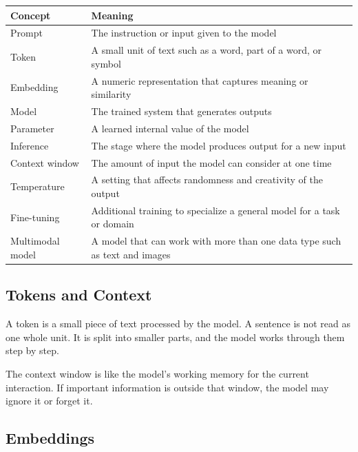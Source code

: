 \documentclass[11pt,a4paper]{article}
\begin{document}
\begin{longtable}{@{}p{3.6cm}p{9.9cm}@{}}
\toprule
\rowcolor{primary!15}
\textbf{Concept} & \textbf{Meaning} \\
\midrule
\endhead
Prompt & The instruction or input given to the model \\
\addlinespace
Token & A small unit of text such as a word, part of a word, or symbol \\
\addlinespace
Embedding & A numeric representation that captures meaning or similarity \\
\addlinespace
Model & The trained system that generates outputs \\
\addlinespace
Parameter & A learned internal value of the model \\
\addlinespace
Inference & The stage where the model produces output for a new input \\
\addlinespace
Context window & The amount of input the model can consider at one time \\
\addlinespace
Temperature & A setting that affects randomness and creativity of the output \\
\addlinespace
Fine-tuning & Additional training to specialize a general model for a task or domain \\
\addlinespace
Multimodal model & A model that can work with more than one data type such as text and images \\
\bottomrule
\end{longtable}

\subsection{Tokens and Context}

\begin{definitionbox}[Token]
A token is a small piece of text processed by the model. A sentence is not read as one whole unit. It is split into smaller parts, and the model works through them step by step.
\end{definitionbox}

\begin{conceptbox}
The context window is like the model's working memory for the current interaction. If important information is outside that window, the model may ignore it or forget it.
\end{conceptbox}

\subsection{Embeddings}
\end{document}
